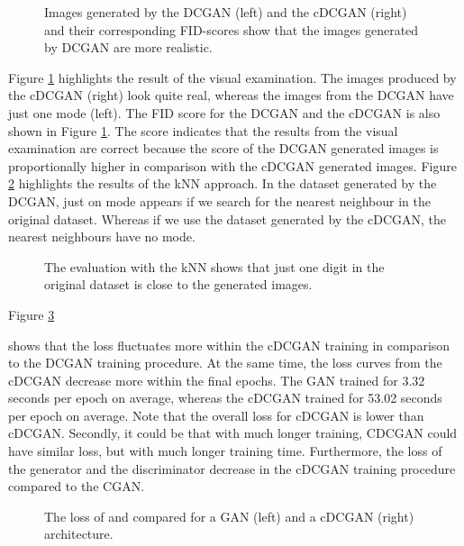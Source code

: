 \documentclass[journal]{IEEEtran}
\begin{document}
{{\begin{figure}[htp]
	\centering
	\caption{
		 Images generated by the DCGAN (left) and the cDCGAN (right) and their corresponding FID-scores show that the images generated by DCGAN are more realistic. 
	}
	\label{fig:visual-fid-gan-cgan}
\end{figure}

Figure \ref{fig:visual-fid-gan-cgan} highlights the result of the visual examination. The images produced by the cDCGAN (right) look quite real, whereas the images from the DCGAN have just one mode (left). The FID score for the DCGAN and the cDCGAN is also shown in Figure \ref{fig:visual-fid-gan-cgan}. The score indicates that the results from the visual examination are correct because the score of the DCGAN generated images is proportionally higher in comparison with the cDCGAN generated images. Figure \ref{fig:knn-gan-cgan} highlights the results of the kNN approach. In the dataset generated by the DCGAN, just on mode appears if we search for the nearest neighbour in the original dataset. Whereas if we use the dataset generated by the cDCGAN, the nearest neighbours have no mode. 

\begin{figure}[htp]
	\centering
	\caption{
		 The evaluation with the kNN shows that just one digit in the original dataset is close to the generated images.
	}
	\label{fig:knn-gan-cgan}
\end{figure}

Figure \ref{fig:evaluation-training-proces}} shows that the loss fluctuates more within the cDCGAN training in comparison to the DCGAN training procedure. At the same time, the loss curves from the cDCGAN decrease more within the final epochs. The GAN trained for 3.32 seconds per epoch on average, whereas the cDCGAN trained for 53.02 seconds per epoch on average. Note that the overall loss for cDCGAN is lower than cDCGAN. Secondly, it could be that with much longer training, CDCGAN could have similar loss, but with much longer training time. Furthermore, the loss of the generator and the discriminator decrease in the cDCGAN training procedure compared to the CGAN.

\begin{figure}[htp]
	\centering
	\caption{
		The loss of  and  compared for a GAN (left) and a cDCGAN (right) architecture. 
	}
	\label{fig:evaluation-training-proces}
\end{figure}

}
\end{document}
